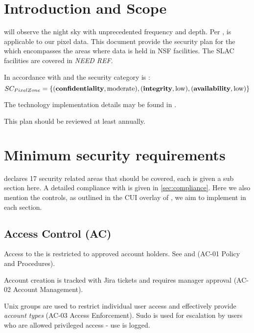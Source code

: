 
\section{Introduction and Scope}

\VRO will observe the night sky with unprecedented frequency and depth.
Per ,  is applicable to our pixel data.
This document provide the security plan for the \PZ which encompasses the areas where data is held in NSF facilities.
The SLAC facilities are covered in \emph{NEED REF}.

In accordance with  and  the  security category is :
\begin{equation} \label{eq:SC}
SC_{Pixel Zone} = \{({\bf confidentiality}, \text{moderate}), ({\bf integrity}, \text{low}), ({\bf availability}, \text{low})\}
\end{equation}

The technology implementation details may be found in .

This plan should be reviewed at least annually.


\section{Minimum security requirements} \label{sec:secreq}
 declares 17 security related areas that should be covered, each is given a sub section here.
A detailed compliance with  is given in \autoref{sec:compliance}.
Here we also mention the controls, as outlined in the CUI overlay of , we aim to implement in each section.



\subsection{Access Control (AC)} \label{sec:AC}
Access to the \PZ is restricted to approved account holders. See  and  (AC-01  Policy and Procedures).

Account creation is tracked with Jira tickets and requires manager approval (AC-02  Account Management).

Unix groups are used to restrict individual user access and effectively provide \emph{account types} (AC-03  Access Enforcement).
Sudo is used for escalation by users who are allowed privileged access - use is logged.

